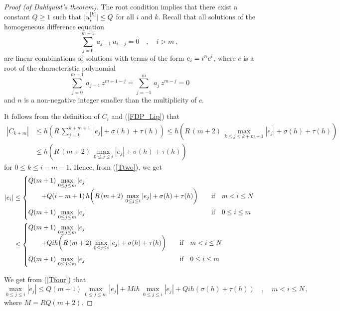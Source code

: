 \begin{proof}[Proof (of Dahlquist's theorem)]
The root condition implies that there exist a constant $Q \geq 1$ such
that $\displaystyle | u_i^{[k]} | \leq Q$ for all $i$ and $k$.  Recall that all
solutions of the homogeneous difference equation
\begin{equation} \label{Tthree}
\sum_{j=0}^{m+1}\,a_{j-1}\,u_{i-j} = 0 \quad , \quad i > m \ ,
\end{equation}
are linear combinations of solutions with terms of the
form $\displaystyle e_i = i^n c^i$, where $c$ is a root of the
characteristic polynomial
\[
  \sum_{j=0}^{m+1}\, a_{j-1}\,z^{m+1-j} =
  \sum_{j=-1}^m\, a_j\,z^{m-j} = 0
\]
and $n$ is a non-negative integer smaller than the multiplicity of
$c$.

It follows from the definition of $C_i$ and (\ref{FDP_Lip}) that
\begin{align*}
|C_{k+m}| &\leq h\left(R\,\sum_{j=k}^{k+m+1}\,|e_j| +\sigma(h) + \tau(h)
\right)
\leq h\left(R\,(m+2)\,\max_{k\leq j \leq k+m+1} |e_j|
+ \sigma(h) + \tau(h) \right) \\
& \leq h\left(R\,(m+2)\,\max_{0\leq j \leq i} |e_j| +\sigma(h) + \tau(h)
\right)
\end{align*}
for  $0\leq k \leq i-m -1$.  Hence, from (\ref{Ttwo}), we get
\begin{align}
|e_i| & \leq
\begin{cases}
\displaystyle Q(m+1)\,\max_{0\leq j \leq m} |e_j| & \\
\displaystyle \qquad + Q(i-m+1)\,h \bigg( R\,(m+2)\,\max_{0\leq j \leq i} |e_j|
+ \sigma(h) + \tau(h) \bigg) & \quad \text{if}\quad  m< i \leq N\\[1em]
\displaystyle Q(m+1)\,\max_{0\leq j \leq m} |e_j| & \quad \text{if}
\quad 0\leq i \leq m
\end{cases}  \nonumber \\
& \leq
\begin{cases}
\displaystyle Q(m+1)\,\max_{0\leq j \leq m} |e_j| & \\
\displaystyle \qquad + Qih \bigg( R\,(m+2)\,\max_{0\leq j \leq i} |e_j|
+ \sigma(h) + \tau(h) \bigg) & \quad \text{if}\quad  m< i \leq N\\[1em]
\displaystyle Q(m+1)\,\max_{0\leq j \leq m} |e_j| & \quad \text{if}
\quad 0\leq i \leq m
\end{cases}  \label{Tfour}
\end{align}

We get from (\ref{Tfour}) that
\begin{equation}\label{Tsix}
\max_{0\leq j \leq i} |e_j| \leq
Q(m+1)\,\max_{0\leq j \leq m} |e_j|
+ M i h\,\max_{0\leq j \leq i} |e_j|
+ Q i h \left(\sigma(h) + \tau(h) \right) \quad , \quad m < i \leq N \, ,
\end{equation}
where $M= RQ(m+2)$.


\end{proof}
